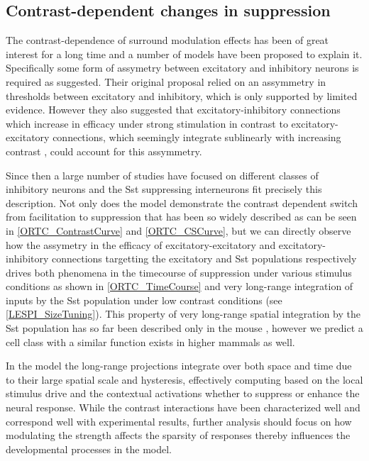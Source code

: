 \subsection{Contrast-dependent changes in suppression}

The contrast-dependence of surround modulation effects has been of
great interest for a long time and a number of models have been
proposed to explain it. Specifically some form of assymetry between
excitatory and inhibitory neurons is required as \cite{Somers1998}
suggested. Their original proposal relied on an assymmetry in
thresholds between excitatory and inhibitory, which is only supported
by limited evidence. However they also suggested that
excitatory-inhibitory connections which increase in efficacy under
strong stimulation in contrast to excitatory-excitatory connections,
which seemingly integrate sublinearly with increasing contrast
\citep{Abbott1997, Tsodyks1997}, could account for this assymmetry.

Since then a large number of studies have focused on different classes
of inhibitory neurons and the Sst suppressing interneurons fit
precisely this description. Not only does the model demonstrate the
contrast dependent switch from facilitation to suppression that has
been so widely described \citep{Levitt1997, Polat1998, Dragoi2000,
  Wang2009} as can be seen in \ref{ORTC_ContrastCurve} and
\ref{ORTC_CSCurve}, but we can directly observe how the assymetry in
the efficacy of excitatory-excitatory and excitatory-inhibitory
connections targetting the excitatory and Sst populations respectively
drives both phenomena in the timecourse of suppression under various
stimulus conditions as shown in \ref{ORTC_TimeCourse} and very
long-range integration of inputs by the Sst population under low
contrast conditions (see \ref{LESPI_SizeTuning}). This property of
very long-range spatial integration by the Sst population has so far
been described only in the mouse \citep{Adesnik2012}, however we
predict a cell class with a similar function exists in higher mammals
as well.

In the model the long-range projections integrate over both space and
time due to their large spatial scale and hysteresis, effectively
computing based on the local stimulus drive and the contextual
activations whether to suppress or enhance the neural response. While
the contrast interactions have been characterized well and correspond
well with experimental results, further analysis should focus on how
modulating the strength affects the sparsity of responses thereby
influences the developmental processes in the model.

